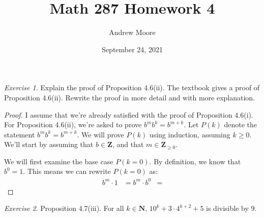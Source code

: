 \documentclass[12pt,oneside]{amsart}
\title{Math 287 Homework 4}
\author{Andrew Moore}
\date{September 24, 2021} %
\theoremstyle{remark}
\newtheorem{exer}{Exercise}
\newcommand{\bfN}{\mathbf{N}}
\newcommand{\bfZ}{\mathbf{Z}}
\begin{document}
\maketitle

%
%
%
%

\newpage
\begin{exer}
Explain the proof of Proposition 4.6(ii). The textbook gives a proof of Proposition 4.6(ii). Rewrite the proof in more detail and with more explanation.
\end{exer}

\begin{proof}
I assume that we're already satisfied with the proof of Proposition 4.6(i). For Proposition 4.6(ii), we're asked to prove $b^mb^k = b^{m + k}$. Let $P(k)$ denote the statement $b^mb^k = b^{m + k}$. We will prove $P(k)$ using induction, assuming $k \geq 0$. We'll start by assuming that $b \in \bfZ$, and that $m \in \bfZ_{\geq 0}$.

We will first examine the base case $P(k = 0)$. By definition, we know that $b^0 = 1$. This means we can rewrite $P(k = 0)$ as:
\begin{align*}
b^m \cdot 1 &= b^m \cdot b^0 &=
\end{align*}
\end{proof}

%
%
%
%

\newpage
\begin{exer}
Proposition 4.7(iii). For all $k \in \bfN$, $10^k + 3 \cdot 4^{k+2} + 5$ is divisible by $9$.
\end{exer}
\end{document}
